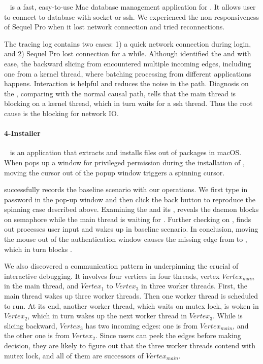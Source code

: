 ~\cite{SequelPro} is a fast, easy-to-use Mac database management
application for . It allows user to connect to database with socket or ssh.
We experienced the non-responsiveness of Sequel Pro when it lost network
connection and tried reconnections.

The tracing log contains two cases: 1) a quick network connection during login,
and 2) Sequel Pro lost connection for a while. Although \xxx identified the
\spinningnode and \similarnode with ease, the backward slicing from
\similarnode encountered multiple incoming edges, including one from a kernel
thread, where batching processing from different applications happens.
Interaction is helpful and reduces the noise in the path.  Diagnosis on the
\spinningnode, comparing with the normal causal path, tells that the main thread
is blocking on a kernel thread, which in turn waits for a ssh thread. Thus the
root cause is the blocking for network IO.

\paragraph{4-Installer}

~\cite{Installer} is an application that extracts
and installs files out of  packages in macOS. When  pops up a
window for privileged permission during the installation of
, moving the cursor out of the popup window triggers a
spinning cursor.

\xxx successfully records the baseline scenario with our operations. We first
type in password in the pop-up window and then click the back button to
reproduce the spinning case described above.  Examining the \spinningnode and
its \similarnode, \xxx reveals the daemon  blocks on semaphore while
the main thread is waiting for . Further checking on , \xxx
finds out  processes user input and wakes up  in
baseline scenario. In conclusion, moving the mouse out of the authentication
window causes the missing edge from  to , which in
turn blocks .

We also discovered a communication pattern in  underpinning the
crucial of interactive debugging. It involves four vertices in four threads,
vertex $Vertex_{main}$ in the main thread, and $Vertex_1$ to $Vertex_3$ in
three worker threads. First, the main thread wakes up three worker threads.
Then one worker thread is scheduled to run. At its end, another worker thread,
which waits on mutex lock, is woken in $Vertex_2$, which in turn wakes up the
next worker thread in $Vertex_3$. While \xxx is slicing backward, $Vertex_3$
has two incoming edges: one is from $Vertex_{main}$, and the other one is from
$Vertex_2$. Since users can peek the edges before making decision, they are
likely to figure out that the three worker threads contend with mutex lock, and
all of them are successors of $Vertex_{main}$.

